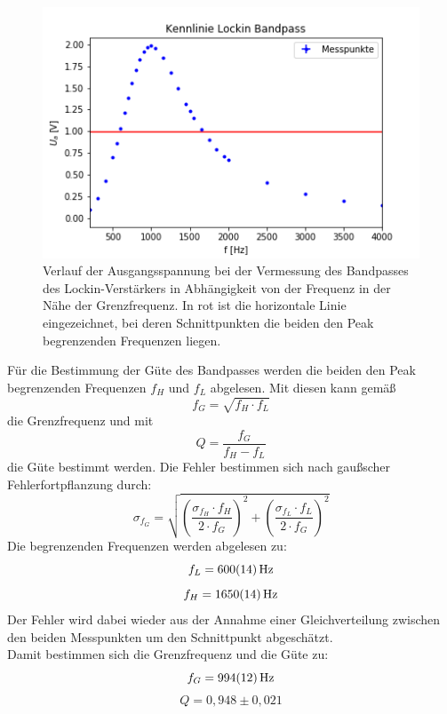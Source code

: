 \documentclass[12pt,a4paper]{article}
\begin{document}
\begin{figure}
\centering
\includegraphics[scale=1]{Bilder/Vorversuch2/AblesenBandpass.png}
\caption[test]{Verlauf der Ausgangsspannung bei der Vermessung des Bandpasses des Lockin-Verstärkers in Abhängigkeit von der Frequenz in der Nähe der Grenzfrequenz. In rot ist die horizontale Linie eingezeichnet, bei deren Schnittpunkten die beiden den Peak begrenzenden Frequenzen liegen.}
\label{fig:LockinBandpass_Ablesen}
\end{figure}

Für die Bestimmung der Güte des Bandpasses werden die beiden den Peak begrenzenden Frequenzen $f_H$ und $f_L$ abgelesen. Mit diesen kann gemäß
\begin{equation*}
f_G = \sqrt{f_H \cdot f_L}
\end{equation*}
die Grenzfrequenz und mit
\begin{equation*}
Q = \dfrac{f_G}{f_H - f_L}
\end{equation*}
die Güte bestimmt werden. Die Fehler bestimmen sich nach gaußscher Fehlerfortpflanzung durch:
\begin{equation*}
\sigma _{f_G} = \sqrt{\left( \dfrac{\sigma _{f_H} \cdot f_H}{2 \cdot f_G} \right)^2 + \left( \dfrac{\sigma _{f_L} \cdot f_L}{2 \cdot f_G} \right)^2}
\end{equation*}
Die begrenzenden Frequenzen werden abgelesen zu:
\begin{equation*}
f_L = \SI{600 \pm 14}{Hz}
\end{equation*}
\begin{equation*}
f_H = \SI{1650 \pm 14}{Hz}
\end{equation*}
Der Fehler wird dabei wieder aus der Annahme einer Gleichverteilung zwischen den beiden Messpunkten um den Schnittpunkt abgeschätzt. \\
Damit bestimmen sich die Grenzfrequenz und die Güte zu:
\begin{equation*}
f_G = \SI{994 \pm 12}{Hz}
\end{equation*}
\begin{equation*}
Q = 0,948 \pm 0,021
\end{equation*}
\end{document}

